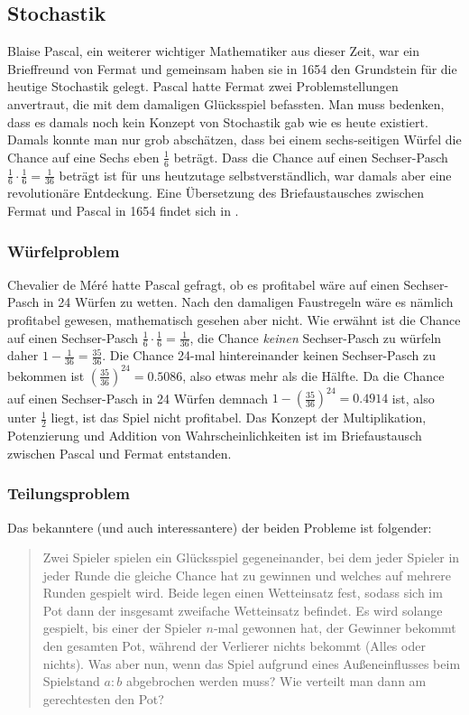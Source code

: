 \subsection{Stochastik} \label{sec:stochastik}
    Blaise Pascal, ein weiterer wichtiger Mathematiker aus dieser Zeit, war ein Brieffreund von Fermat und gemeinsam haben sie in 1654 den Grundstein für die heutige \Gls{Stochastik} gelegt. Pascal hatte Fermat zwei Problemstellungen anvertraut, die mit dem damaligen Glücksspiel befassten. Man muss bedenken, dass es damals noch kein Konzept von Stochastik gab wie es heute existiert. Damals konnte man nur grob abschätzen, dass bei einem sechs-seitigen Würfel die Chance auf eine Sechs eben $\frac{1}{6}$ beträgt. Dass die Chance auf einen Sechser-Pasch $\frac{1}{6} \cdot \frac{1}{6} = \frac{1}{36}$ beträgt ist für uns heutzutage selbstverständlich, war damals aber eine revolutionäre Entdeckung. Eine Übersetzung des Briefaustausches zwischen Fermat und Pascal in 1654 findet sich in \cite{fermatPascalProb}. 

    \subsubsection{Würfelproblem}
        Chevalier de Méré hatte Pascal gefragt, ob es profitabel wäre auf einen Sechser-Pasch in 24 Würfen zu wetten. Nach den damaligen Faustregeln wäre es nämlich profitabel gewesen, mathematisch gesehen aber nicht. Wie erwähnt ist die Chance auf einen Sechser-Pasch $\frac{1}{6} \cdot \frac{1}{6} = \frac{1}{36}$, die Chance \textit{keinen} Sechser-Pasch zu würfeln daher $1 - \frac{1}{36} = \frac{35}{36}$. Die Chance 24-mal hintereinander keinen Sechser-Pasch zu bekommen ist $(\frac{35}{36})^{24} = 0.5086$, also etwas mehr als die Hälfte. Da die Chance auf einen Sechser-Pasch in 24 Würfen demnach $1-(\frac{35}{36})^{24}=0.4914$ ist, also unter $\frac{1}{2}$ liegt, ist das Spiel nicht profitabel. Das Konzept der Multiplikation, Potenzierung und Addition von Wahrscheinlichkeiten ist im Briefaustausch zwischen Pascal und Fermat entstanden.

    \subsubsection{Teilungsproblem}
        Das bekanntere (und auch interessantere) der beiden Probleme ist folgender: 
        \begin{quote}
            Zwei Spieler spielen ein Glücksspiel gegeneinander, bei dem jeder Spieler in jeder Runde die gleiche Chance hat zu gewinnen und welches auf mehrere Runden gespielt wird. Beide legen einen Wetteinsatz fest, sodass sich im Pot dann der insgesamt zweifache Wetteinsatz befindet. Es wird solange gespielt, bis einer der Spieler $n$-mal gewonnen hat, der Gewinner bekommt den gesamten Pot, während der Verlierer nichts bekommt (Alles oder nichts). Was aber nun, wenn das Spiel aufgrund eines Außeneinflusses beim Spielstand $a:b$ abgebrochen werden muss? Wie verteilt man dann am gerechtesten den Pot?
        \end{quote}

